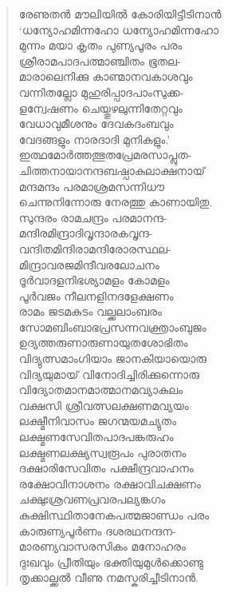 \begin{verse}
രേണുതന്‍ മൗലിയില്‍ കോരിയിട്ടീടിനാന്‍\\
‘ധന്യോഹമിന്നഹോ ധന്യോഹമിന്നഹോ\\
മുന്നം മയാ കൃതം പുണ്യപൂരം പരം\\
ശ്രീരാമപാദപത്മാഞ്ചിതം ഭൂതല-\\
മാരാലെനിക്കു കാണ്മാനവകാശവും\\
വന്നിതല്ലോ മുഹുരിപ്പാദപാംസുക്ക-\\
ളന്വേഷണം ചെയ്തുഴലുന്നിതേറ്റവും\\
വേധാവുമീശനും ദേവകദംബവും\\
വേദങ്ങളും നാരദാദി മുനികളും.’\\
ഇത്ഥമോര്‍ത്തത്ഭുതപ്രേമരസാപ്ലുത-\\
ചിത്തനായാനന്ദബഷ്പാകുലാക്ഷനായ്\\
മന്ദമന്ദം പരമാശ്രമസന്നിധൗ\\
ചെന്നുനിന്നോരു നേരത്തു കാണായിതു.\\
സുന്ദരം രാമചന്ദ്രം പരമാനന്ദ-\\
മന്ദിരമിന്ദ്രാദിവൃന്ദാരകവൃന്ദ-\\
വന്ദിതമിന്ദിരാമന്ദിരോരസ്ഥല-\\
മിന്ദ്രാവരജമിന്ദീവരലോചനം\\
ദൂര്‍വാദളനിഭശ്യാമളം കോമളം\\
പൂര്‍വജം നീലനളിനദളേക്ഷണം\\
രാമം ജടമകുടം വല്ക്കലാംബരം\\
സോമബിംബാഭപ്രസന്നവക്ത്രാംബുജം\\
ഉദ്യത്തരുണാരുണായുതശോഭിതം\\
വിദ്യുത്സമാംഗിയാം ജാനകിയായൊരു\\
വിദ്യയുമായ് വിനോദിച്ചിരിക്കുന്നൊരു\\
വിദ്യോതമാനമാത്മാനമവ്യാകുലം\\
വക്ഷസി ശ്രീവത്സലക്ഷണമവ്യയം\\
ലക്ഷ്മീനിവാസം ജഗന്മയമച്യുതം\\
ലക്ഷ്മണസേവിതപാദപങ്കരുഹം\\
ലക്ഷ്മണലക്ഷ്യസ്വരൂപം പുരാതനം\\
ദക്ഷാരിസേവിതം പക്ഷീന്ദ്രവാഹനം\\
രക്ഷോവിനാശനം രക്ഷാവിചക്ഷണം\\
ചക്ഷുഃശ്രവണപ്രവരപല്യങ്കഗം\\
കുക്ഷിസ്ഥിതാനേകപത്മജാണ്ഡം പരം\\
കാരുണ്യപൂര്‍ണം ദശരഥനന്ദന-\\
മാരണ്യവാസരസികം മനോഹരം\\
ദുഃഖവും പ്രീതിയും ഭക്തിയുമുള്‍ക്കൊണ്ടു\\
തൃക്കാല്ക്കല്‍ വീണു നമസ്കരിച്ചീടിനാന്‍.\\

\end{verse}
